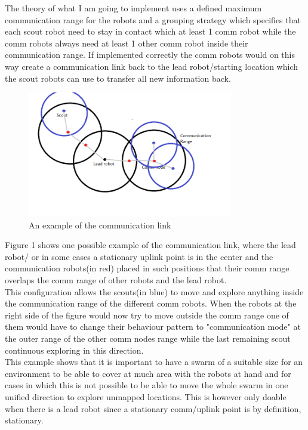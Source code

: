 \documentclass[10pt,a4paper]{article}
\begin{document}
\begin{flushleft}
The theory of what I am going to implement uses a defined maximum communication range for the robots and a grouping strategy which specifies that each scout robot need to stay in contact which at least 1 comm robot while the comm robots always need at least 1 other comm robot inside their communication range. If implemented correctly the comm robots would on this way create a communication link back to the lead robot/starting location which the scout robots can use to transfer all new information back.\\

\begin{figure}[h]
\centering
\includegraphics[width = 0.8\textwidth]{figures/comm_example.png} 
\caption{An example of the communication link}
\label{Figure 1}
\end{figure}

Figure 1 shows one possible example of the communication link, where the lead robot/ or in some cases a stationary uplink point is in the center and the communication robots(in red) placed in such positions that their comm range overlaps the comm range of other robots and the lead robot. \\
This configuration allows the scouts(in blue) to move and explore anything inside the communication range of the different comm robots. When the robots at the right side of the figure would now try to move outside the comm range one of them would have to change their behaviour pattern to "communication mode" at the outer range of the other comm nodes range while the last remaining scout continuous exploring in this direction. \\
This example shows that it is important to have a swarm of a suitable size for an environment to be able to cover at much area with the robots at hand and for cases in which this is not possible to be able to move the whole swarm in one unified direction to explore unmapped locations. This is however only doable when there is a lead robot since a stationary comm/uplink point is by definition, stationary.\\


\end{flushleft}
\end{document}
